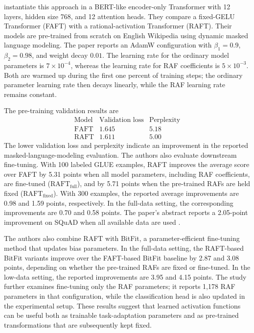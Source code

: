 \textcite{fang2023raft} instantiate this approach in a BERT-like
encoder-only Transformer with 12 layers, hidden size 768, and 12
attention heads. They compare a fixed-GELU Transformer (FAFT) with a
rational-activation Transformer (RAFT). Their models are pre-trained
from scratch on English Wikipedia using dynamic masked language
modeling. The paper reports an AdamW configuration with
\(\beta_1=0.9\), \(\beta_2=0.98\), and weight decay \(0.01\). The
learning rate for the ordinary model parameters is \(7\times10^{-4}\),
whereas the learning rate for RAF coefficients is \(5\times10^{-3}\).
Both are warmed up during the first one percent of training steps; the
ordinary parameter learning rate then decays linearly, while the RAF
learning rate remains constant.

The pre-training validation results are
\begin{equation}
    \begin{array}{c|cc}
        \text{Model} & \text{Validation loss} & \text{Perplexity}\\
        \hline
        \text{FAFT} & 1.645 & 5.18\\
        \text{RAFT} & 1.611 & 5.00
    \end{array}
    \label{eq:act-raf-pretraining-results}
\end{equation}
The lower validation loss and perplexity indicate an improvement in
the reported masked-language-modeling evaluation. The authors also
evaluate downstream fine-tuning. With 100 labeled GLUE examples,
RAFT improves the average score over FAFT by 5.31 points when all
model parameters, including RAF coefficients, are fine-tuned
(\(\mathrm{RAFT}_{\mathrm{full}}\)), and by 5.71 points when the
pre-trained RAFs are held fixed
(\(\mathrm{RAFT}_{\mathrm{fixed}}\)). With 300 examples, the reported
average improvements are 0.98 and 1.59 points, respectively. In the
full-data setting, the corresponding improvements are 0.70 and
0.58 points. The paper's abstract reports a 2.05-point improvement
on SQuAD when all available data are used
\parencite{fang2023raft}.

The authors also combine RAFT with BitFit, a parameter-efficient
fine-tuning method that updates bias parameters. In the full-data
setting, the RAFT-based BitFit variants improve over the FAFT-based
BitFit baseline by 2.87 and 3.08 points, depending on whether the
pre-trained RAFs are fixed or fine-tuned. In the low-data setting,
the reported improvements are 3.95 and 4.15 points. The study further
examines fine-tuning only the RAF parameters; it reports 1,178 RAF
parameters in that configuration, while the classification head is
also updated in the experimental setup. These results suggest that
learned activation functions can be useful both as trainable
task-adaptation parameters and as pre-trained transformations that
are subsequently kept fixed.

